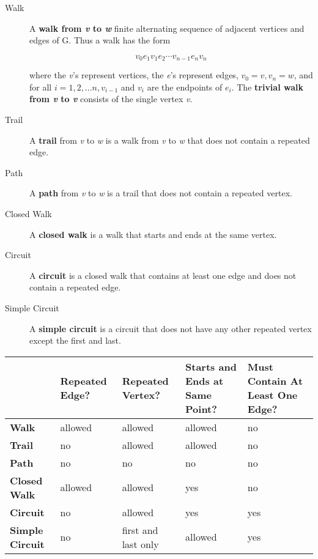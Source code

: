 \documentclass{article}
\begin{document}
\begin{description}
\item [Walk] A \textbf{walk from \textit{v} to \textit{w}} finite alternating sequence of adjacent vertices and edges of G. Thus a walk has the form

\begin{equation}
v_0 e_1 v_1 e_2 \cdots v_{n-1} e_n v_n
\end{equation}

where the \textit{v}’s represent vertices, the \textit{e}’s represent edges, $v_0 = v, v_n = w$, and for all $i = 1, 2, \ldots n, v_{i − 1}$ and $v_i$ are the endpoints of $e_i$. The \textbf{trivial walk from \textit{v} to \textit{v}} consists of the single vertex \textit{v}.

\item [Trail] A \textbf{trail} from \textit{v} to \textit{w} is a walk from \textit{v} to \textit{w} that does not contain a repeated edge.

\item [Path] A \textbf{path} from \textit{v} to \textit{w} is a trail that does not contain a repeated vertex.

\item [Closed Walk] A \textbf{closed walk} is a walk that starts and ends at the same vertex.

\item [Circuit] A \textbf{circuit} is a closed walk that contains at least one edge and does not contain a repeated edge.

\item [Simple Circuit] A \textbf{simple circuit} is a circuit that does not have any other repeated vertex except the first and last.
\end{description}

\begin{center}
\begin{tabular}{ |L|L|L|L|L| }
    \hline
    & \textbf{Repeated Edge?} & \textbf{Repeated Vertex?} & \textbf{Starts and Ends at Same Point?} & \textbf{Must Contain At Least One Edge?} \\ \hline
    \textbf{Walk} & allowed & allowed & allowed & no \\ \hline
    \textbf{Trail} & no & allowed & allowed & no \\ \hline
    \textbf{Path} & no & no & no & no \\ \hline
    \textbf{Closed Walk} & allowed & allowed & yes & no \\ \hline
    \textbf{Circuit} & no & allowed & yes & yes \\ \hline
    \textbf{Simple Circuit} & no & first and last only & allowed & yes \\ \hline
\end{tabular}
\end{center}
\end{document}
